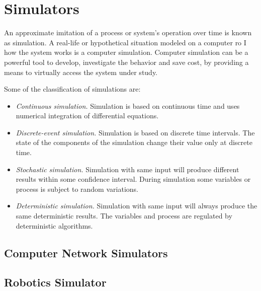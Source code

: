 \section{Simulators}

An approximate imitation of a process or system's operation over time is known as simulation. A real-life or hypothetical situation modeled on a computer ro I how the system works is a computer simulation. Computer simulation can be a powerful tool to develop, investigate the behavior and save cost, by providing a means to virtually access the system under study.

Some of the classification of simulations are:
\begin{itemize}
	\item \textit{Continuous simulation.} Simulation is based on continuous time and uses numerical integration of differential equations.
	\item \textit{Discrete-event simulation.} Simulation is based on discrete time intervals. The state of the components of the simulation change their value only at discrete time. 
	\item \textit{Stochastic simulation.} Simulation with same input will produce different results within some confidence interval. During simulation some variables or process is subject to random variations.
	\item \textit{Deterministic simulation.} Simulation with same input will always produce the same deterministic results. The variables and process are regulated by deterministic algorithms. 
\end{itemize}

\subsection{Computer Network Simulators}

\subsection{Robotics Simulator}


\FloatBarrier


